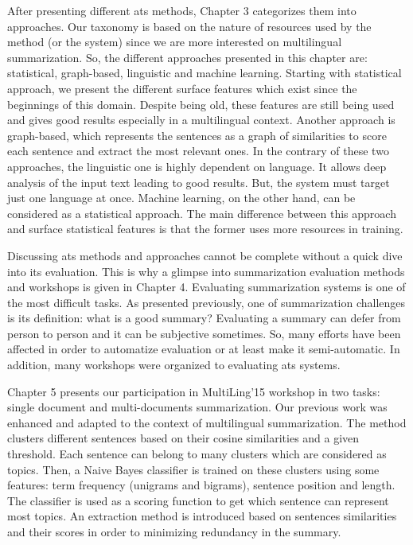 After presenting different \ac{ats} methods, Chapter 3 categorizes them into approaches. 
Our taxonomy is based on the nature of resources used by the method (or the system) since we are more interested on multilingual summarization. 
So, the different approaches presented in this chapter are: statistical, graph-based, linguistic and machine learning. 
Starting with statistical approach, we present the different surface features which exist since the beginnings of this domain. 
Despite being old, these features are still being used and gives good results especially in a multilingual context.
Another approach is graph-based, which represents the sentences as a graph of similarities to score each sentence and extract the most relevant ones.
In the contrary of these two approaches, the linguistic one is highly dependent on language.
It allows deep analysis of the input text leading to good results.
But, the system must target just one language at once.
Machine learning, on the other hand, can be considered as a statistical approach. 
The main difference between this approach and surface statistical features is that the former uses more resources in training. 


Discussing \ac{ats} methods and approaches cannot be complete without a quick dive into its evaluation.
This is why a glimpse into summarization evaluation methods and workshops is given in Chapter 4.
Evaluating summarization systems is one of the most difficult tasks.
As presented previously, one of summarization challenges is its definition: what is a good summary?
Evaluating a summary can defer from person to person and it can be subjective sometimes. 
So, many efforts have been affected in order to automatize evaluation or at least make it semi-automatic.
In addition, many workshops were organized to evaluating \ac{ats} systems.


Chapter 5 presents our participation in MultiLing'15 workshop in two tasks: single document and multi-documents summarization.
Our previous work \citep{15-aries-al} was enhanced and adapted to the context of multilingual summarization. 
The method clusters different sentences based on their cosine similarities and a given threshold. 
Each sentence can belong to many clusters which are considered as topics. 
Then, a Naive Bayes classifier is trained on these clusters using some features: term frequency (unigrams and bigrams), sentence position and length. 
The classifier is used as a scoring function to get which sentence can represent most topics. 
An extraction method is introduced based on sentences similarities and their scores in order to minimizing redundancy in the summary.


